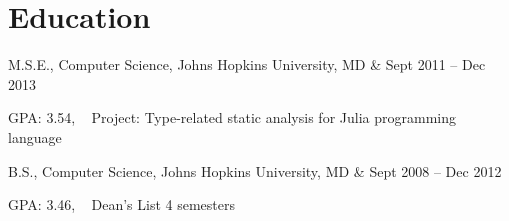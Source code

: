 \documentclass[letterpaper]{article}
\begin{document}
\section*{Education}
\begin{list1}
 \item
  \begin{tabular1bold}
   M.S.E., Computer Science, Johns Hopkins University, MD & Sept 2011 -- Dec 2013 \\
  \end{tabular1bold}

 \begin{list2}
  \item GPA: 3.54, \mbox{ } 
   Project: Type-related static analysis for Julia programming language
 \end{list2}

 \item
  \begin{tabular1bold}
   B.S., Computer Science, Johns Hopkins University, MD & Sept 2008 -- Dec 2012 \\
  \end{tabular1bold}

  \begin{list2}
  \item 
	    GPA: 3.46, \mbox{ }
	    Dean's List 4 semesters
  \end{list2}

\end{list1}
\end{document}
